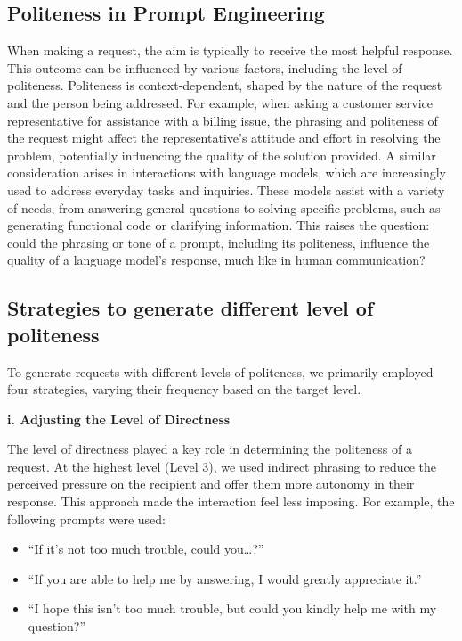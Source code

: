 \documentclass[11pt]{article}
\begin{document}
\subsection{Politeness in Prompt Engineering}
When making a request, the aim is typically to receive the most helpful response. This outcome can be influenced by various factors, including the level of politeness. Politeness is context-dependent, shaped by the nature of the request and the person being addressed. For example, when asking a customer service representative for assistance with a billing issue, the phrasing and politeness of the request might affect the representative's attitude and effort in resolving the problem, potentially influencing the quality of the solution provided. A similar consideration arises in interactions with language models, which are increasingly used to address everyday tasks and inquiries. These models assist with a variety of needs, from answering general questions to solving specific problems, such as generating functional code or clarifying information. This raises the question: could the phrasing or tone of a prompt, including its politeness, influence the quality of a language model's response, much like in human communication?

\subsection{Strategies to generate different level of politeness}
To generate requests with different levels of politeness, we primarily employed four strategies, varying their frequency based on the target level.

\textbf{i. Adjusting the Level of Directness}

The level of directness played a key role in determining the politeness of a request. At the highest level (Level 3), we used indirect phrasing to reduce the perceived pressure on the recipient and offer them more autonomy in their response. This approach made the interaction feel less imposing. For example, the following prompts were used:  
\begin{itemize}
    \item “If it’s not too much trouble, could you…?”
    \item “If you are able to help me by answering, I would greatly appreciate it.”
    \item “I hope this isn’t too much trouble, but could you kindly help me with my question?”
\end{itemize}
\end{document}
